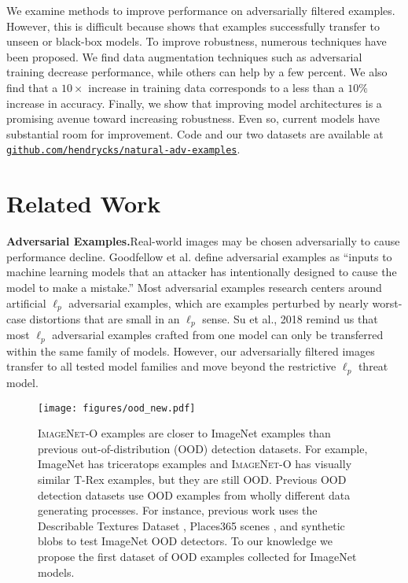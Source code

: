 \documentclass[10pt,twocolumn,letterpaper]{article}
\begin{document}
We examine methods to improve performance on adversarially filtered examples. However, this is difficult because  shows that examples successfully transfer to unseen or black-box models.
To improve robustness, numerous techniques have been proposed. We find data augmentation techniques such as adversarial training decrease performance, while others can help by a few percent. We also find that a $10\times$ increase in training data corresponds to a less than a $10\%$ increase in accuracy. Finally, we show that improving model architectures is a promising avenue toward increasing robustness. Even so, current models have substantial room for improvement. Code and our two datasets are available at \href{https://github.com/hendrycks/natural-adv-examples}{\texttt{github.com/hendrycks/natural-adv-examples}}. %
 
\section{Related Work}
\noindent\textbf{Adversarial Examples.}\quad Real-world images may be chosen adversarially to cause performance decline. Goodfellow et al. \cite{goodfellowblog} define adversarial examples \cite{adversarial} as ``inputs to machine learning models that an attacker has intentionally designed to cause the model to make a mistake.'' Most adversarial examples research centers around artificial $\ell_p$ adversarial examples, which are examples perturbed by nearly worst-case distortions that are small in an $\ell_p$ sense. Su et al., 2018 \cite{Su2018IsRT} remind us that most $\ell_p$ adversarial examples crafted from one model can only be transferred within the same family of models. However, our adversarially filtered images transfer to all tested model families and move beyond the restrictive $\ell_p$ threat model.








\begin{figure}
\centering
\texttt{[image: figures/ood\_new.pdf]}
\caption{
\textsc{ImageNet-O} examples are closer to ImageNet examples than previous out-of-distribution (OOD) detection datasets. For example, ImageNet has triceratops examples and \textsc{ImageNet-O} has visually similar T-Rex examples, but they are still OOD.
Previous OOD detection datasets use OOD examples from wholly different data generating processes. For instance, previous work uses the Describable Textures Dataset \cite{cimpoi14describing}, Places365 scenes \cite{zhou2017places}, and synthetic blobs to test ImageNet OOD detectors.
To our knowledge we propose the first dataset of OOD examples collected for ImageNet models.}\label{fig:ood}
\vspace{-5pt}
\end{figure}
\end{document}
